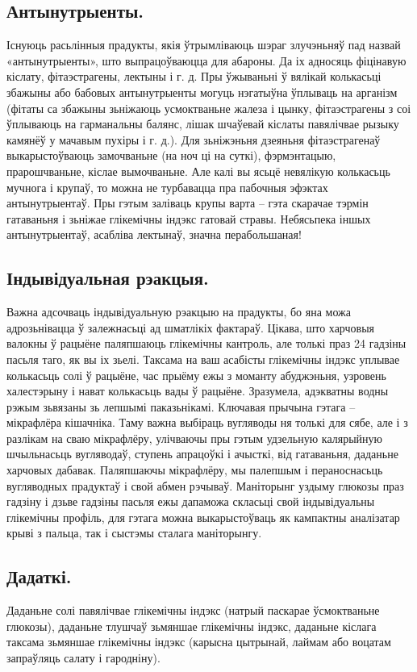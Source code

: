 \subsection{Антынутрыенты.}
Існуюць расьлінныя прадукты, якія ўтрымліваюць шэраг злучэньняў пад назвай «антынутрыенты», што выпрацоўваюцца для абароны. Да іх адносяць фіцінавую кіслату, фітаэстрагены, лектыны і г. д. Пры ўжываньні ў вялікай колькасьці збажыны або бабовых антынутрыенты могуць нэгатыўна ўплываць на арганізм (фітаты са збажыны зьніжаюць усмоктваньне жалеза і цынку, фітаэстрагены з соі ўплываюць на гарманальны балянс, лішак шчаўевай кіслаты павялічвае рызыку камянёў у мачавым пухіры і г. д.). Для зьніжэньня дзеяньня фітаэстрагенаў выкарыстоўваюць замочваньне (на ноч ці на суткі), фэрмэнтацыю, прарошчваньне, кіслае вымочваньне. Але калі вы ясьцё невялікую колькасьць мучнога і крупаў, то можна не турбавацца пра пабочныя эфэктах антынутрыентаў. Пры гэтым заліваць крупы варта – гэта скарачае тэрмін гатаваньня і зьніжае глікемічны індэкс гатовай стравы. Небясьпека іншых антынутрыентаў, асабліва лектынаў, значна перабольшаная!

\subsection{Індывідуальная рэакцыя.}
Важна адсочваць індывідуальную рэакцыю на прадукты, бо яна можа адрозьнівацца ў залежнасьці ад шматлікіх фактараў. Цікава, што харчовыя валокны ў рацыёне паляпшаюць глікемічны кантроль, але толькі праз 24 гадзіны пасьля таго, як вы іх зьелі. Таксама на ваш асабісты глікемічны індэкс уплывае колькасьць солі ў рацыёне, час прыёму ежы з моманту абуджэньня, узровень халестэрыну і нават колькасьць вады ў рацыёне. Зразумела, адэкватны водны рэжым зьвязаны зь лепшымі паказьнікамі. Ключавая прычына гэтага – мікрафлёра кішачніка. Таму важна выбіраць вугляводы ня толькі для сябе, але і з разлікам на сваю мікрафлёру, улічваючы пры гэтым удзельную калярыйную шчыльнасьць вугляводаў, ступень апрацоўкі і ачысткі, від гатаваньня, даданьне харчовых дабавак. Паляпшаючы мікрафлёру, мы палепшым і пераноснасьць вугляводных прадуктаў і свой абмен рэчываў. Маніторынг уздыму глюкозы праз гадзіну і дзьве гадзіны пасьля ежы дапаможа скласьці свой індывідуальны глікемічны профіль, для гэтага можна выкарыстоўваць як кампактны аналізатар крыві з пальца, так і сыстэмы сталага маніторынгу.

\subsection{Дадаткі.}
Даданьне солі павялічвае глікемічны індэкс (натрый паскарае ўсмоктваньне глюкозы), даданьне тлушчаў зьмяншае глікемічны індэкс, даданьне кіслага таксама зьмяншае глікемічны індэкс (карысна цытрынай, лаймам або воцатам запраўляць салату і гародніну).


